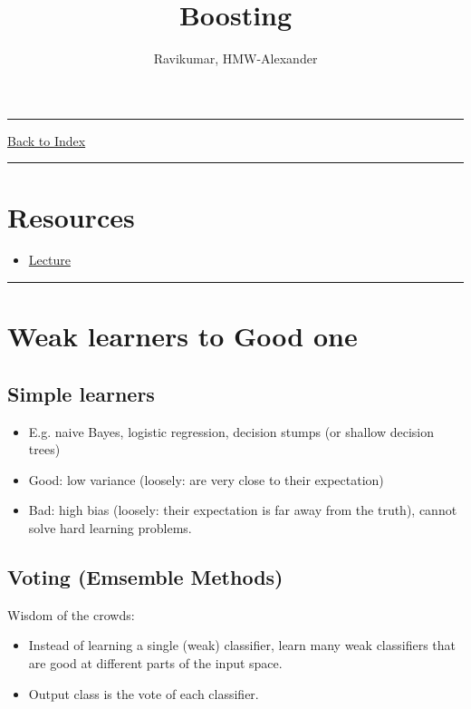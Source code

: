 \documentclass[letterpaper,10pt]{article}
\title{\textbf{Boosting}}
\author{Ravikumar, HMW-Alexander}
\newcommand{\panhline}{\begin{center}\rule{\textwidth}{1pt}\end{center}}
\begin{document}
\maketitle

\panhline
\href{../index.html}{Back to Index}

\panhline
\tableofcontents

\section*{Resources}

\begin{itemize}
	\item \href{../../Lectures/LectureFile.pdf}{Lecture}
\end{itemize}

\panhline

\section{Weak learners to Good one}

\subsection{Simple learners}
\begin{itemize}
	\item E.g. naive Bayes, logistic regression, decision stumps (or shallow decision trees)
	\item Good: low variance (loosely: are very close to their expectation)
	\item Bad: high bias (loosely: their expectation is far away from the truth), cannot solve hard learning problems.
\end{itemize}
	
\subsection{Voting (Emsemble Methods)}

Wisdom of the crowds:
\begin{itemize}
	\item Instead of learning a single (weak) classifier, learn many weak classifiers that are good at different parts of the input space.
	\item Output class is the vote of each classifier.
\end{itemize}
\end{document}
